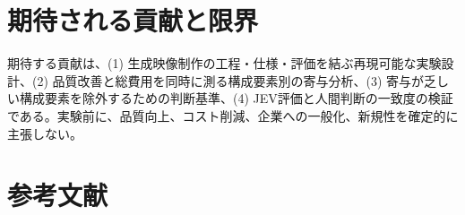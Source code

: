 \documentclass[11pt,a4paper]{article}
\begin{document}
\section{期待される貢献と限界}
期待する貢献は、(1) 生成映像制作の工程・仕様・評価を結ぶ再現可能な実験設計、(2) 品質改善と総費用を同時に測る構成要素別の寄与分析、(3) 寄与が乏しい構成要素を除外するための判断基準、(4) JEV評価と人間判断の一致度の検証である。実験前に、品質向上、コスト削減、企業への一般化、新規性を確定的に主張しない。

\section{参考文献}


\end{document}
